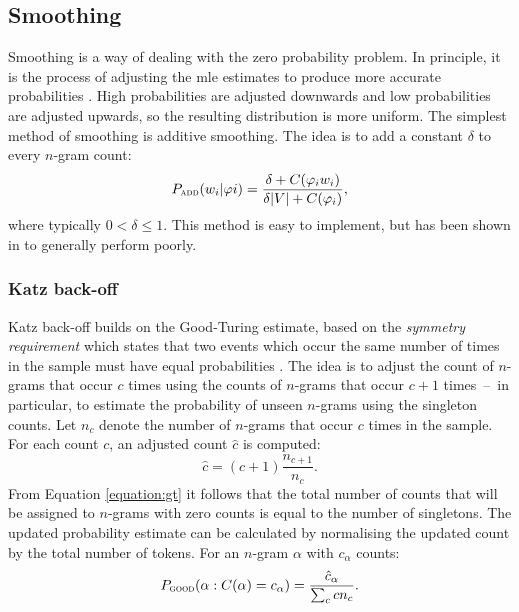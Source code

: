 	\subsection{Smoothing}
	\label{subsection:smoothing}
	Smoothing is a way of dealing with the zero probability problem. In principle, it is the process of adjusting the \gls{mle} estimates to produce more accurate probabilities \cite{chen1996empirical}. High probabilities are adjusted downwards and low probabilities are adjusted upwards, so the resulting distribution is more uniform. The simplest method of smoothing is additive smoothing. The idea is to add a constant $\delta$ to every \mbox{$n$-gram} count:
	\begin{equation}
		P_{\textsc{add}}(w_{i}|\varphi{i})=\frac{\delta+C(\varphi_{i}w_{i})}{\delta|V|+C(\varphi_{i})},
	\end{equation}
where typically $0 < \delta \leq 1$. This method is easy to implement, but has been shown in \cite{Gale94what'swrong} to generally perform poorly.
	\subsubsection*{Katz back-off}
	Katz back-off builds on the Good-Turing estimate, based on the \textit{symmetry requirement} which states that two events which occur the same number of times in the sample must have equal probabilities \cite{whittaker2000statistical}. The idea is to adjust the count of \mbox{$n$-grams} that occur $c$ times using the counts of \mbox{$n$-grams} that occur $c+1$ times~--~in particular, to estimate the probability of unseen \mbox{$n$-grams} using the singleton counts. Let $n_{c}$ denote the number of \mbox{$n$-grams} that occur $c$ times in the sample. For each count $c$, an adjusted count $\hat{c}$ is computed:
	\begin{equation}
		\hat{c}=(c+1)\frac{n_{c+1}}{n_{c}}.
		\label{equation:gt}
	\end{equation}
	From Equation \ref{equation:gt} it follows that the total number of counts that will be assigned to \mbox{$n$-grams} with zero counts is equal to the number of singletons. The updated probability estimate can be calculated by normalising the updated count by the total number of tokens. For an \mbox{$n$-gram} $\alpha$ with $c_{\alpha}$ counts:
	\begin{equation}
		P_{\textsc{good}}(\alpha:C(\alpha)=c_{\alpha})=\frac{\hat{c}_{\alpha}}{\sum_{c}cn_{c}}.
	\end{equation}

